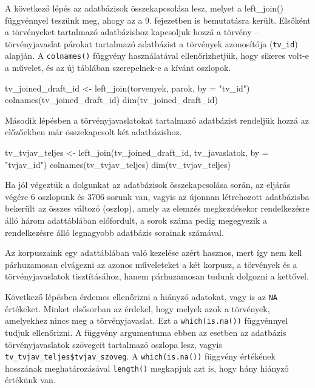 \documentclass[
]{book}
\newenvironment{Shaded}{\begin{snugshade}}{\end{snugshade}}
\newcommand{\AttributeTok}[1]{\textcolor[rgb]{0.77,0.63,0.00}{#1}}
\newcommand{\FunctionTok}[1]{\textcolor[rgb]{0.00,0.00,0.00}{#1}}
\newcommand{\NormalTok}[1]{#1}
\newcommand{\OtherTok}[1]{\textcolor[rgb]{0.56,0.35,0.01}{#1}}
\newcommand{\StringTok}[1]{\textcolor[rgb]{0.31,0.60,0.02}{#1}}
\begin{document}
A következő lépés az adatbázisok összekapcsolása lesz, melyet a
left\_join() függvénnyel teszünk meg, ahogy az a 9. fejezetben is
bemutatásra került. Elsőként a törvényeket tartalmazó adatbázishoz
kapcsoljuk hozzá a törvény -- törvényjavaslat párokat tartalmazó
adatbázist a törvények azonosítója (\texttt{tv\_id}) alapján. A
\texttt{colnames()} függvény használatával ellenőrizhetjük, hogy sikeres
volt-e a művelet, és az új táblában szerepelnek-e a kívánt oszlopok.

\begin{Shaded}
\begin{Highlighting}[]
\NormalTok{tv\_joined\_draft\_id }\OtherTok{\textless{}{-}} \FunctionTok{left\_join}\NormalTok{(torvenyek, parok, }\AttributeTok{by =} \StringTok{"tv\_id"}\NormalTok{)}
\FunctionTok{colnames}\NormalTok{(tv\_joined\_draft\_id)}
\FunctionTok{dim}\NormalTok{(tv\_joined\_draft\_id)}
\end{Highlighting}
\end{Shaded}

Második lépésben a törvényjavaslatokat tartalmazó adatbázist rendeljük
hozzá az előzőekben már összekapcsolt két adatbázishoz.

\begin{Shaded}
\begin{Highlighting}[]
\NormalTok{tv\_tvjav\_teljes }\OtherTok{\textless{}{-}} \FunctionTok{left\_join}\NormalTok{(tv\_joined\_draft\_id, tv\_javaslatok, }\AttributeTok{by =} \StringTok{"tvjav\_id"}\NormalTok{)}
\FunctionTok{colnames}\NormalTok{(tv\_tvjav\_teljes)}
\FunctionTok{dim}\NormalTok{(tv\_tvjav\_teljes)}
\end{Highlighting}
\end{Shaded}

Ha jól végeztük a dolgunkat az adatbázisok összekapcsolása során, az
eljárás végére 6 oszlopunk és 3706 sorunk van, vagyis az újonnan
létrehozott adatbázisba bekerült az összes változó (oszlop), amely az
elemzés megkezdésekor rendelkezésre álló három adattáblában előfordult,
a sorok száma pedig megegyezik a rendelkezésre álló legnagyobb adatbázis
sorainak számával.

Az korpuszaink egy adattáblában való kezelése azért hasznos, mert így
nem kell párhuzamosan elvágezni az azonos műveleteket a két korpusz, a
törvények és a törvényjavaslatok tisztításához, hanem párhuzamosan
tudunk dolgozni a kettővel.

Következő lépésben érdemes ellenőrizni a hiányzó adatokat, vagy is az
\texttt{NA} értékeket. Minket elsősorban az érdekel, hogy melyek azok a
törvények, amelyekhez nincs meg a törvényjavaslat. Ezt a
\texttt{which(is.na())} függvénnyel tudjuk ellenőrizni. A függvény
argumentuma ebben az esetben az adatbázis törvényjavaslatok szövegeit
tartalmazó oszlopa lesz, vagyis
\texttt{tv\_tvjav\_teljes\$tvjav\_szoveg}. A \texttt{which(is.na())}
függvény értékének hosszának meghatározásával \texttt{length()}
megkapjuk azt is, hogy hány hiányzó értékünk van.
\end{document}

